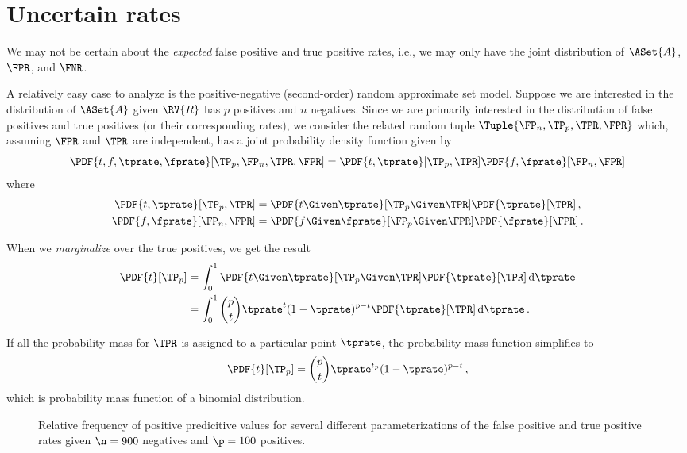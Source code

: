 \documentclass[ ../main.tex]{subfiles}
\begin{document}
\section{Uncertain rates}
\label{sec:intervals}
We may not be certain about the \emph{expected} false positive and true positive rates, i.e., we may only have the joint distribution of $\ASet{A}$, $\FPR$, and $\FNR$.

A relatively easy case to analyze is the positive-negative (second-order) random approximate set model.
Suppose we are interested in the distribution of $\ASet{A}$ given $\RV{R}$ has $p$ positives and $n$ negatives.
Since we are primarily interested in the distribution of false positives and true positives (or their corresponding rates), we consider the related random tuple $\Tuple{\FP_n, \TP_p, \TPR, \FPR}$ which, assuming $\FPR$ and $\TPR$ are independent, has a joint probability density function given by
\begin{equation}
	\PDF{t,f,\tprate,\fprate}[\TP_p, \FP_n,\TPR,\FPR] = \PDF{t, \tprate}[\TP_p,\TPR] \PDF{f,\fprate}[\FP_n,\FPR]
\end{equation}
where
\begin{align}
	\PDF{t,\tprate}[\TP_p,\TPR] &= \PDF{t \Given \tprate}[\TP_p \Given \TPR] \PDF{\tprate}[\TPR]\,,\\
	\PDF{f,\fprate}[\FP_n,\FPR] &= \PDF{f \Given \fprate}[\FP_p \Given \FPR] \PDF{\fprate}[\FPR]\,.
\end{align}

When we \emph{marginalize} over the true positives, we get the result
\begin{equation}
\begin{split}
	\PDF{t}[\TP_p] &= \int_{0}^{1} \PDF{t \Given \tprate}[\TP_p \Given \TPR] \PDF{\tprate}[\TPR] \dif \tprate\\
	                 &= \int_{0}^{1} \binom{p}{t} \tprate^{t}(1-\tprate)^{p-t} \PDF{\tprate}[\TPR] \dif \tprate\,.
\end{split}
\end{equation}

If all the probability mass for $\TPR$ is assigned to a particular point $\tprate$, the probability mass function simplifies to
\begin{equation}
\PDF{t}[\TP_p] = \binom{p}{t} \tprate^{t_p}(1-\tprate)^{p-t}\,,
\end{equation}
which is probability mass function of a binomial distribution.

\begin{figure}
	\def\svgwidth{\columnwidth}
	\centering
	\captionsetup{justification=centering}
	\caption
	{
		Relative frequency of positive predicitive values for several different parameterizations of the false positive and true positive rates given $\n = 900$ negatives and $\p=100$ positives.
	}    
	
	\label{fig:mixnorm}
\end{figure}
\end{document}
